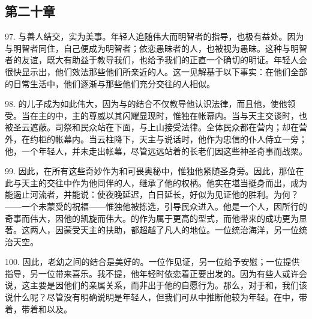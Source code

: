 
\subsection{第二十章}

\par

97. 与善人结交，实为美事。年轻人追随伟大而明智者的指导，也极有益处。因为与明智者同住，自己便成为明智者；依恋愚昧者的人，也被视为愚昧。这种与明智者的友谊，既大有助益于教导我们，也给予我们的正直一个确切的明证。年轻人会很快显示出，他们效法那些他们所亲近的人。这一见解基于以下事实：在他们全部的日常生活中，他们逐渐与那些他们充分交往的人相似。\par

98. 的儿子成为如此伟大，因为与的结合不仅教导他认识法律，而且他，使他领受。当在主的中，主的尊威以其闪耀显现时，惟独在帐幕内。当与天主交谈时，也被圣云遮蔽。司祭和民众站在下面，与上山接受法律。全体民众都在营内；却在营外，在约柜的帐幕内。当云柱降下，天主与说话时，他作为忠信的仆人侍立一旁；他，一个年轻人，并未走出帐幕，尽管远远站着的长老们因这些神圣奇事而战栗。\par

99. 因此，在所有这些奇妙作为和可畏奥秘中，惟独他紧随圣身旁。因此，那位在此与天主的交往中作为他同伴的人，继承了他的权柄。他实在堪当挺身而出，成为能遏止河流者，并能说：使夜晚延迟，白日延长，好似为见证他的胜利。为何？——一个未蒙受的祝福——惟独他被拣选，引导民众进入。他是一个人，因所行的奇事而伟大，因他的凯旋而伟大。的作为属于更高的型式，而他带来的成功更为显著。这两人，因蒙受天主的扶助，都超越了凡人的地位。一位统治海洋，另一位统治天空。\par

100. 因此，老幼之间的结合是美好的。一位作见证，另一位给予安慰；一位提供指导，另一位带来喜乐。我不提，他年轻时依恋着正要出发的。因为有些人或许会说，这主要是因他们的亲属关系，而非出于他的自愿行为。那么，对于和，我们该说什么呢？尽管没有明确说明是年轻人，但我们可从中推断他较为年轻。在中，带着，带着和以及。\par

